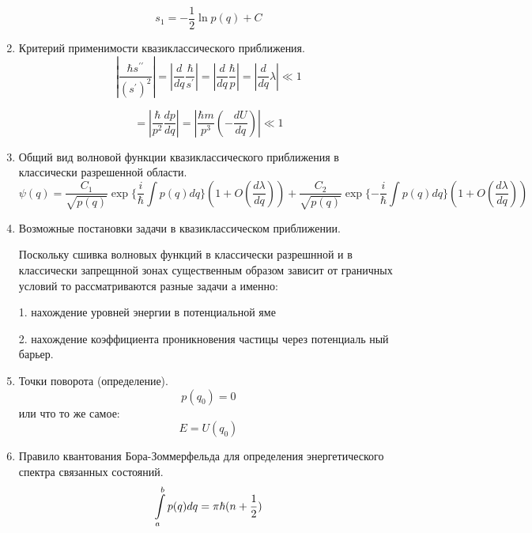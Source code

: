 \documentclass{article}
\begin{document}
\begin{enumerate}
\begin{equation}
s_{1}=-\frac{1}{2}\ln p(q)+C
\end{equation}


		\item {Критерий применимости квазиклассического приближения.}  
\begin{equation}
|\frac{\hbar s^{\prime\prime}}{(s^{\prime})^{2}}|=|\frac{d}{dq}\frac{\hbar}{s^{\prime}}|=|\frac{d}{dq}\frac{\hbar}{p}|=|\frac{d}{dq}\lambda|\ll1
\end{equation}


\begin{equation}
=|\frac{\hbar}{p^{2}}\frac{dp}{dq}|=|\frac{\hbar m}{p^{3}}(-\frac{dU}{dq})|\ll1
\end{equation}


		\item {Общий вид волновой функции квазиклассического приближения в классически разрешенной области.} 
\begin{equation}
\psi(q)=\frac{C_{1}}{\sqrt{p(q)}}\exp\{\frac{i}{\hbar}\int p(q)dq\}(1+O(\frac{d\lambda}{dq}))+\frac{C_{2}}{\sqrt{p(q)}}\exp\{-\frac{i}{\hbar}\int p(q)dq\}(1+O(\frac{d\lambda}{dq}))
\end{equation}


		\item {Возможные постановки задачи в квазиклассическом приближении.} 
		
		Поскольку сшивка волновых функций в классически разрешнной и в
классически запрещнной зонах существенным образом зависит от граничных
условий то рассматриваются разные задачи а именно:

1. нахождение уровней энергии в потенциальной яме

2. нахождение коэффициента проникновения частицы через потенциаль
ный барьер.

		\item {Точки поворота (определение).}  
\begin{equation}
p(q_{0})=0
\end{equation}
или что то же самое:
\begin{equation}
E=U(q_{0})
\end{equation}


		\item {Правило квантования Бора-Зоммерфельда для определения энергетического спектра связанных состояний.}  
\begin{equation}
\intop_{a}^{b}p(q)dq=\pi\hbar(n+\frac{1}{2})
\end{equation}



\end{enumerate}
\end{document}
